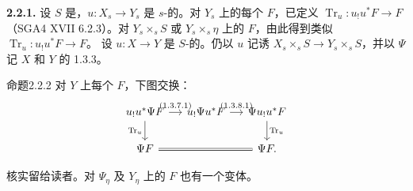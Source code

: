 \textbf{2.2.1.} 设 $S$ 是，$u:X_s\to Y_s$ 是 $s$-的。对 $Y_s$ 上的每个 $F$，已定义 $\operatorname{Tr}_u:u_!u^*F\to F$（SGA4 XVII 6.2.3）。对 $Y_s\times_sS$ 或 $Y_s\times_s\eta$ 上的 $F$，由此得到类似 $\operatorname{Tr}_u:u_!u^*F\to F$。
设 $u:X\to Y$ 是 $S$-的。仍以 $u$ 记诱 $X_s\times_sS\to Y_s\times_sS$，并以 $\Psi$ 记 $X$ 和 $Y$ 的 1.3.3。
\begin{SGAresult}{命题}{2.2.2}
对 $Y$ 上每个 $F$，下图交换：
\[
\begin{tikzcd}[column sep=small]
u_!u^*\Psi F\arrow[r,"(1.3.7.1)"]\arrow[d,"\operatorname{Tr}_u"']&u_!\Psi u^*F\arrow[r,"(1.3.8.1)"]&\Psi u_!u^*F\arrow[d,"\operatorname{Tr}_u"]\\
\Psi F\arrow[rr,equal]&&\Psi F.
\end{tikzcd}
\]
\end{SGAresult}
核实留给读者。对 $\Psi_\eta$ 及 $Y_\eta$ 上的 $F$ 也有一个变体。

